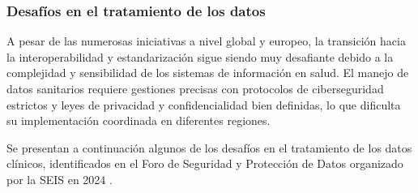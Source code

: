 \subsubsection{Desafíos en el tratamiento de los datos}


A pesar de las numerosas iniciativas a nivel global y europeo, la transición hacia la interoperabilidad y estandarización sigue siendo muy desafiante debido a la complejidad y sensibilidad de los sistemas de información en salud. El manejo de datos sanitarios requiere gestiones precisas con protocolos de ciberseguridad estrictos y leyes de privacidad y confidencialidad bien definidas, lo que dificulta su implementación coordinada en diferentes regiones.

Se presentan a continuación algunos de los desafíos en el tratamiento de los datos clínicos, identificados en el Foro de Seguridad y Protección de Datos organizado por la SEIS en 2024 \cite{SEIS2024tercera, SEIS2024octava}.

